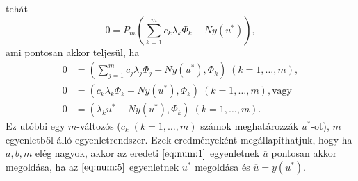 \documentclass[oneside, titlepage, 12pt, a4paper]{report}
\begin{document}
tehát
\begin{equation*}
0 = P_m (\sum_{k = 1}^m c_k \lambda_k \Phi_k - N y(u^*)),
\end{equation*}
ami pontosan akkor teljesül, ha
\begin{align}
0 &= (\sum_{j = 1}^m c_j \lambda_j \Phi_j - N y(u^*), \Phi_k) \; (k = 1, \dots, m), \nonumber \\
0 &= (c_k \lambda_k \Phi_k - N y(u^*), \Phi_k) \; (k = 1, \dots, m), \text{vagy} \nonumber \\
0 &= (\lambda_k u^* - N y(u^*), \Phi_k) \; (k = 1, \dots, m). \label{eq:num:5}
\end{align}
Ez utóbbi egy $m$-változós ($c_k \; (k = 1, \dots, m)$ számok meghatározzák $u^*$-ot), $m$ egyenletből álló egyenletrendszer. Ezek eredményeként megállapíthatjuk, hogy ha $a, b, m$ elég nagyok, akkor az eredeti $\eqref{eq:num:1}$ egyenletnek $\overline{u}$ pontosan akkor megoldása, ha az $\eqref{eq:num:5}$ egyenletnek $u^*$ megoldása és $\overline{u} = y(u^*)$. \\








 

 
\end{document}
